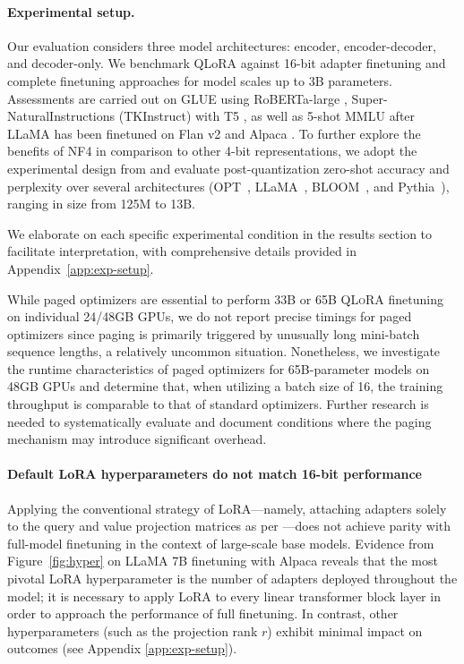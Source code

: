 \paragraph{Experimental setup.} Our evaluation considers three model architectures: encoder, encoder-decoder, and decoder-only. We benchmark QLoRA against 16-bit adapter finetuning and complete finetuning approaches for model scales up to 3B parameters. Assessments are carried out on GLUE \citep{wang2018glue} using RoBERTa-large \citep{liu2019roberta}, Super-NaturalInstructions (TKInstruct) \citep{wang2022super} with T5 \citep{t5}, as well as 5-shot MMLU \citep{hendrycksmeasuring} after LLaMA has been finetuned on Flan v2 \citep{longpre2023flan} and Alpaca \citep{alpaca}. To further explore the benefits of NF4 in comparison to other 4-bit representations, we adopt the experimental design from \citet{dettmers2022case} and evaluate post-quantization zero-shot accuracy and perplexity over several architectures (OPT~\citep{zhang2022opt}, LLaMA~\citep{touvron2023llama}, BLOOM~\citep{scao2022bloom}, and Pythia~\citep{biderman2023pythia}), ranging in size from 125M to 13B.

We elaborate on each specific experimental condition in the results section to facilitate interpretation, with comprehensive details provided in Appendix~\ref{app:exp-setup}.

While paged optimizers are essential to perform 33B or 65B \textsc{QLoRA} finetuning on individual 24/48GB GPUs, we do not report precise timings for paged optimizers since paging is primarily triggered by unusually long mini-batch sequence lengths, a relatively uncommon situation. Nonetheless, we investigate the runtime characteristics of paged optimizers for 65B-parameter models on 48GB GPUs and determine that, when utilizing a batch size of 16, the training throughput is comparable to that of standard optimizers. Further research is needed to systematically evaluate and document conditions where the paging mechanism may introduce significant overhead.

\paragraph{Default LoRA hyperparameters do not match 16-bit performance}

Applying the conventional strategy of LoRA—namely, attaching adapters solely to the query and value projection matrices as per \citep{hu2021lora}—does not achieve parity with full-model finetuning in the context of large-scale base models. Evidence from Figure~\ref{fig:hyper} on LLaMA 7B finetuning with Alpaca reveals that the most pivotal LoRA hyperparameter is the number of adapters deployed throughout the model; it is necessary to apply LoRA to every linear transformer block layer in order to approach the performance of full finetuning. In contrast, other hyperparameters (such as the projection rank $r$) exhibit minimal impact on outcomes (see Appendix \ref{app:exp-setup}).

